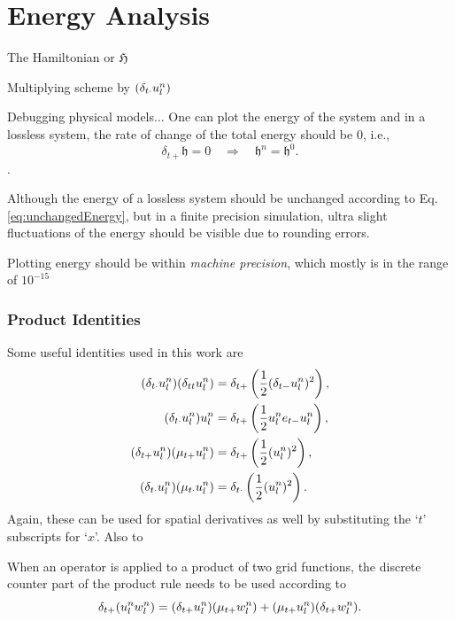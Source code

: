 {{

\section{Energy Analysis}\label{sec:energyAnalysis}

The Hamiltonian or $\mathfrak{H}$

Multiplying scheme by $\left(\delta_{t\cdot} u_l^n \right)$

Debugging physical models...
One can plot the energy of the system and in a lossless system, the rate of change of the total energy should be 0, i.e.,
\begin{equation}\label{eq:unchangedEnergy}
    \delta_{t+}\mathfrak{h} = 0 \quad \Longrightarrow \quad \mathfrak{h}^n = \mathfrak{h}^0.
\end{equation}
.

Although the energy of a lossless system should be unchanged according to Eq. \eqref{eq:unchangedEnergy}, but in a finite precision simulation, ultra slight fluctuations of the energy should be visible due to rounding errors. 

Plotting energy should be within \textit{machine precision}, which mostly is in the range of $10^{-15}$

\subsubsection{Product Identities}
Some useful identities used in this work are
\begin{subequations}
    \begin{align}
        (\delta_{t\cdot} u_l^n)(\delta_{tt} u_l^n) &= \delta_{t+} \left(\frac{1}{2}(\delta_{t-} u_l^n)^2\right),\label{eq:prodIdentity1}\\
        (\delta_{t\cdot} u_l^n)u_l^n &= \delta_{t+} \left(\frac{1}{2}u_l^n e_{t-}u_l^n\right),\label{eq:prodIdentity2}\\
        (\delta_{t+} u_l^n)(\mu_{t+} u_l^n) &= \delta_{t+} \left(\frac{1}{2}(u_l^n)^2\right),\label{eq:prodIdentity3}\\
        (\delta_{t\cdot} u_l^n)(\mu_{t\cdot}u_l^n) &= \delta_{t\cdot}\left(\frac{1}{2} (u_l^n)^2\right).\label{eq:prodIdentity4}
    \end{align}
\end{subequations}
Again, these can be used for spatial derivatives as well by substituting the `$t$' subscripts for `$x$'. Also  to 

When an operator is applied to a product of two grid functions, the discrete counter part of the product rule needs to be used according to
\begin{equation}
    \delta_{t+} (u_l^nw_l^n) = (\delta_{t+} u_l^n)(\mu_{t+}w_l^n) + (\mu_{t+} u_l^n)(\delta_{t+} w_l^n).
\end{equation}


}}
